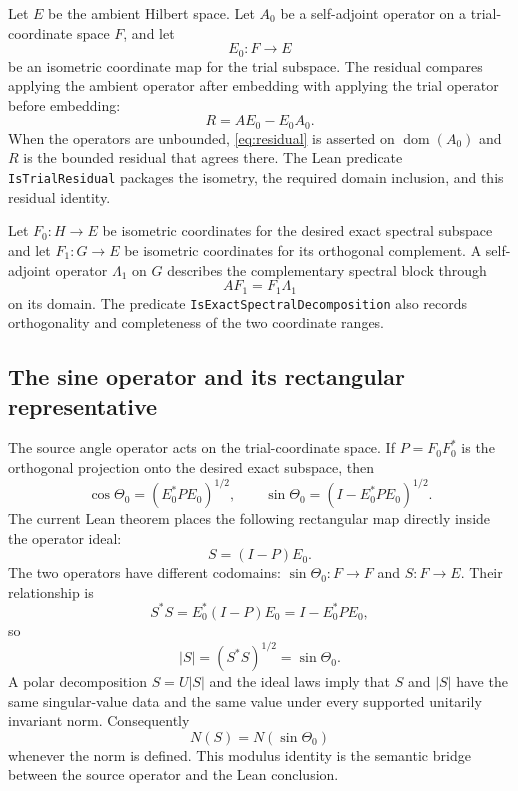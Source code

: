 \documentclass[11pt]{article}
\begin{document}
Let $E$ be the ambient Hilbert space.  Let $A_0$ be a self-adjoint operator on a
trial-coordinate space $F$, and let
\[
  E_0:F\to E
\]
be an isometric coordinate map for the trial subspace.  The residual compares
applying the ambient operator after embedding with applying the trial operator
before embedding:
\begin{equation}
  R = AE_0-E_0A_0.
  \label{eq:residual}
\end{equation}
When the operators are unbounded, \cref{eq:residual} is asserted on
$\operatorname{dom}(A_0)$ and $R$ is the bounded residual that agrees there.
The Lean predicate \texttt{IsTrialResidual} packages the isometry, the required
domain inclusion, and this residual identity.

Let $F_0:H\to E$ be isometric coordinates for the desired exact spectral
subspace and let $F_1:G\to E$ be isometric coordinates for its orthogonal
complement.  A self-adjoint operator $\Lambda_1$ on $G$ describes the
complementary spectral block through
\[
  AF_1 = F_1\Lambda_1
\]
on its domain.  The predicate \texttt{IsExactSpectralDecomposition} also records
orthogonality and completeness of the two coordinate ranges.

\subsection{The sine operator and its rectangular representative}

The source angle operator acts on the trial-coordinate space.  If
$P=F_0F_0^*$ is the orthogonal projection onto the desired exact subspace, then
\[
  \cos\Theta_0 = (E_0^*PE_0)^{1/2},
  \qquad
  \sin\Theta_0 = (I-E_0^*PE_0)^{1/2}.
\]
The current Lean theorem places the following rectangular map directly inside
the operator ideal:
\begin{equation}
  S=(I-P)E_0.
  \label{eq:rectangular-sine}
\end{equation}
The two operators have different codomains:
$\sin\Theta_0:F\to F$ and $S:F\to E$.  Their relationship is
\[
  S^*S
  = E_0^*(I-P)E_0
  = I-E_0^*PE_0,
\]
so
\begin{equation}
  |S|=(S^*S)^{1/2}=\sin\Theta_0.
  \label{eq:modulus-sine}
\end{equation}
A polar decomposition $S=U|S|$ and the ideal laws imply that $S$ and $|S|$
have the same singular-value data and the same value under every supported
unitarily invariant norm.  Consequently
\[
  N(S)=N(\sin\Theta_0)
\]
whenever the norm is defined.  This modulus identity is the semantic bridge
between the source operator and the Lean conclusion.
\end{document}
